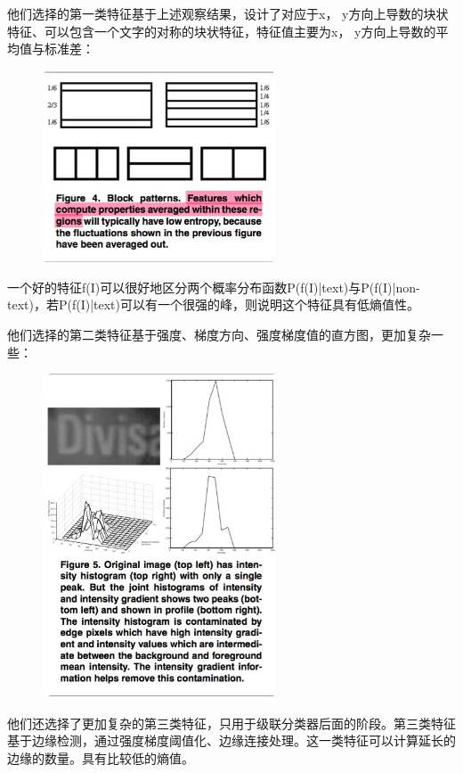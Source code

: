 他们选择的第一类特征基于上述观察结果，设计了对应于x， y方向上导数的块状特征、可以包含一个文字的对称的块状特征，特征值主要为x， y方向上导数的平均值与标准差：
\begin{figure}[H]
    \centering 
    \includegraphics[width=0.618\textwidth]{image/2_1_1_7.jpg}    
    \label{logic}
\end{figure}
一个好的特征f(I)可以很好地区分两个概率分布函数P(f(I)|text)与P(f(I)|non-text)，若P(f(I)|text)可以有一个很强的峰，则说明这个特征具有低熵值性。

他们选择的第二类特征基于强度、梯度方向、强度梯度值的直方图，更加复杂一些：

\begin{figure}[H]
    \centering 
    \includegraphics[width=0.618\textwidth]{image/2_1_1_8.jpg}    
    \label{logic}
\end{figure}
他们还选择了更加复杂的第三类特征，只用于级联分类器后面的阶段。第三类特征基于边缘检测，通过强度梯度阈值化、边缘连接处理。这一类特征可以计算延长的边缘的数量。具有比较低的熵值。

